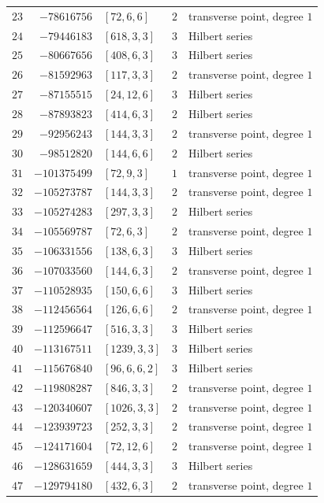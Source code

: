 \documentclass[11pt]{article}
\begin{document}
\begin{center}
\begin{longtable}{r r l c l}
$23$ & $-78616756$ & $[72,6,6]$ & $2$ & transverse point, degree $1$\\
$24$ & $-79446183$ & $[618,3,3]$ & $3$ & Hilbert series\\
$25$ & $-80667656$ & $[408,6,3]$ & $3$ & Hilbert series\\
$26$ & $-81592963$ & $[117,3,3]$ & $2$ & transverse point, degree $1$\\
$27$ & $-87155515$ & $[24,12,6]$ & $3$ & Hilbert series\\
$28$ & $-87893823$ & $[414,6,3]$ & $2$ & Hilbert series\\
$29$ & $-92956243$ & $[144,3,3]$ & $2$ & transverse point, degree $1$\\
$30$ & $-98512820$ & $[144,6,6]$ & $2$ & Hilbert series\\
$31$ & $-101375499$ & $[72,9,3]$ & $1$ & transverse point, degree $1$\\
$32$ & $-105273787$ & $[144,3,3]$ & $2$ & transverse point, degree $1$\\
$33$ & $-105274283$ & $[297,3,3]$ & $2$ & Hilbert series\\
$34$ & $-105569787$ & $[72,6,3]$ & $2$ & transverse point, degree $1$\\
$35$ & $-106331556$ & $[138,6,3]$ & $3$ & Hilbert series\\
$36$ & $-107033560$ & $[144,6,3]$ & $2$ & transverse point, degree $1$\\
$37$ & $-110528935$ & $[150,6,6]$ & $3$ & Hilbert series\\
$38$ & $-112456564$ & $[126,6,6]$ & $2$ & transverse point, degree $1$\\
$39$ & $-112596647$ & $[516,3,3]$ & $3$ & Hilbert series\\
$40$ & $-113167511$ & $[1239,3,3]$ & $3$ & Hilbert series\\
$41$ & $-115676840$ & $[96,6,6,2]$ & $3$ & Hilbert series\\
$42$ & $-119808287$ & $[846,3,3]$ & $2$ & transverse point, degree $1$\\
$43$ & $-120340607$ & $[1026,3,3]$ & $2$ & transverse point, degree $1$\\
$44$ & $-123939723$ & $[252,3,3]$ & $2$ & transverse point, degree $1$\\
$45$ & $-124171604$ & $[72,12,6]$ & $2$ & transverse point, degree $1$\\
$46$ & $-128631659$ & $[444,3,3]$ & $3$ & Hilbert series\\
$47$ & $-129794180$ & $[432,6,3]$ & $2$ & transverse point, degree $1$\\

\end{longtable}
\end{center}
\end{document}

